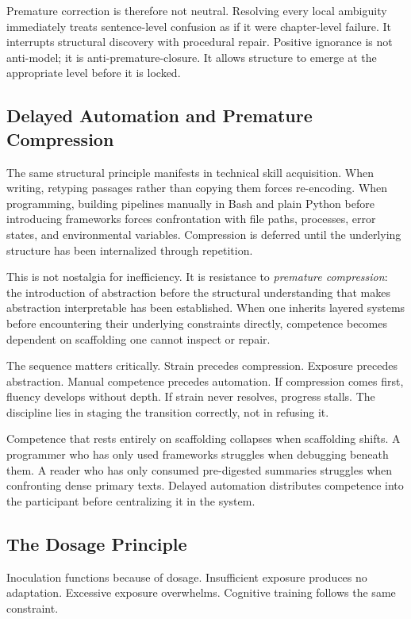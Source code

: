 \documentclass[11pt]{article}
\theoremstyle{remark}
\begin{document}
Premature correction is therefore not neutral. Resolving every local ambiguity immediately treats sentence-level confusion as if it were chapter-level failure. It interrupts structural discovery with procedural repair. Positive ignorance is not anti-model; it is anti-premature-closure. It allows structure to emerge at the appropriate level before it is locked.

\subsection{Delayed Automation and Premature Compression}

The same structural principle manifests in technical skill acquisition. When writing, retyping passages rather than copying them forces re-encoding. When programming, building pipelines manually in Bash and plain Python before introducing frameworks forces confrontation with file paths, processes, error states, and environmental variables. Compression is deferred until the underlying structure has been internalized through repetition.

This is not nostalgia for inefficiency. It is resistance to \emph{premature compression}: the introduction of abstraction before the structural understanding that makes abstraction interpretable has been established. When one inherits layered systems before encountering their underlying constraints directly, competence becomes dependent on scaffolding one cannot inspect or repair.

The sequence matters critically. Strain precedes compression. Exposure precedes abstraction. Manual competence precedes automation. If compression comes first, fluency develops without depth. If strain never resolves, progress stalls. The discipline lies in staging the transition correctly, not in refusing it.

Competence that rests entirely on scaffolding collapses when scaffolding shifts. A programmer who has only used frameworks struggles when debugging beneath them. A reader who has only consumed pre-digested summaries struggles when confronting dense primary texts. Delayed automation distributes competence into the participant before centralizing it in the system.

\subsection{The Dosage Principle}

Inoculation functions because of dosage. Insufficient exposure produces no adaptation. Excessive exposure overwhelms. Cognitive training follows the same constraint.
\end{document}
